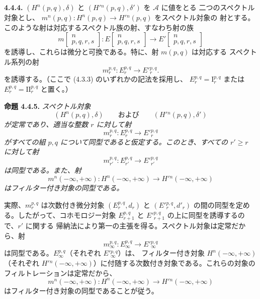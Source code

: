 \clearpage
{}%
\begingroup\small\setlength{\parskip}{0pt}\setlength{\emergencystretch}{1.5em}
\medskip\noindent\textbf{4.4.4.}\quad
$(H^n(p,q),\delta)$ と $(H'{}^n(p,q),\delta')$ を $\mathcal A$ に値をとる
二つのスペクトル対象とし、
$m^n(p,q)\colon H^n(p,q)\longrightarrow H'{}^n(p,q)$ をスペクトル対象の
射とする。このような射は対応するスペクトル族の射、すなわち射の族
\[
m\!\left[\begin{smallmatrix}n\\p,q,r,s\end{smallmatrix}\right]
\colon
E\!\left[\begin{smallmatrix}n\\p,q,r,s\end{smallmatrix}\right]
\longrightarrow
E'\!\left[\begin{smallmatrix}n\\p,q,r,s\end{smallmatrix}\right]
\]
を誘導し、これらは微分と可換である。特に、射 $m(p,q)$ は対応する
スペクトル系列の射
\[
m_r^{p,q}\colon E_r^{p,q}\longrightarrow E'{}_{r}^{p,q}.
\]
を誘導する。（ここで (4.3.3) のいずれかの記法を採用し、
$E_r^{p,q}=\mathrm I_r^{p,q}$ または
$E_r^{p,q}=\mathrm{II}_r^{p,q}$ と置く。）

\medskip\noindent\textbf{命題 4.4.5.}\quad
\textit{スペクトル対象}
\[
(H^n(p,q),\delta)
\qquad\textit{および}\qquad
(H'{}^n(p,q),\delta')
\]
\textit{が定常であり、適当な整数 $r$ に対して射}
\[
m_r^{p,q}\colon E_r^{p,q}\longrightarrow E'{}_{r}^{p,q}
\]
\textit{がすべての組 $p,q$ について同型であると仮定する。このとき、すべての
$r'\geq r$ に対して射}
\[
m_{r'}^{p,q}\colon E_{r'}^{p,q}\longrightarrow E'{}_{r'}^{p,q}
\]
\textit{は同型である。また、射}
\[
m^n(-\infty,+\infty)\colon H^n(-\infty,+\infty)
\longrightarrow H'{}^n(-\infty,+\infty)
\]
\textit{はフィルター付き対象の同型である。}

実際、$m_r^{p,q}$ は次数付き微分対象 $(E_r^{p,q},d_r)$ と
$(E'{}_{r}^{p,q},d'_r)$ の間の同型を定める。したがって、コホモロジー対象
$E_{r+1}^{p,q}$ と $E'{}_{r+1}^{p,q}$ の上に同型を誘導するので、$r'$ に関する
帰納法により第一の主張を得る。スペクトル対象は定常だから、射
\[
m_\infty^{p,q}\colon E_\infty^{p,q}\longrightarrow
E'{}_{\infty}^{p,q}
\]
は同型である。$E_\infty^{p,q}$（それぞれ $E'{}_{\infty}^{p,q}$）は、
フィルター付き対象 $H^n(-\infty,+\infty)$（それぞれ
$H'{}^n(-\infty,+\infty)$）に付随する次数付き対象である。これらの対象の
フィルトレーションは定常だから、
\[
m^n(-\infty,+\infty)\colon H^n(-\infty,+\infty)
\longrightarrow H'{}^n(-\infty,+\infty)
\]
はフィルター付き対象の同型であることが従う。
\endgroup
